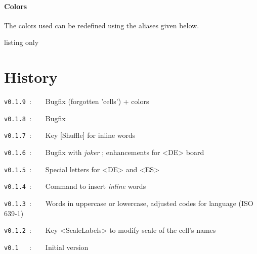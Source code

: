 \documentclass{article}
\begin{document}
\begin{PresentationCode}{}
{\Huge {}}

{\Huge {}}
\end{PresentationCode}

\subsection{Colors}

The colors used can be redefined using the aliases given below.

\begin{PresentationCode}{listing only}
\end{PresentationCode}

\newpage

\part*{History}

\verb|v0.1.9|~:~~~~Bugfix (forgotten 'cells') + colors

\verb|v0.1.8|~:~~~~Bugfix

\verb|v0.1.7|~:~~~~Key \textsf{[Shuffle]} for inline words

\verb|v0.1.6|~:~~~~Bugfix with \textit{joker} ; enhancements for \textsf{<DE>} board

\verb|v0.1.5|~:~~~~Special letters for \textsf{<DE>} and \textsf{<ES>}

\verb|v0.1.4|~:~~~~Command to insert \textit{inline} words

\verb|v0.1.3|~:~~~~Words in uppercase or lowercase, adjusted codes for language (ISO 639-1)

\verb|v0.1.2|~:~~~~Key \textsf{<ScaleLabels>} to modify scale of the cell's names

\verb|v0.1  |~:~~~~Initial version
\end{document}
